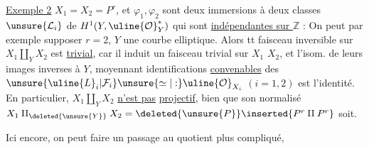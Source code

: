 \uline{Exemple 2}  $X_1=X_2=P^r$, et $\varphi_1,\varphi_2$ sont deux  immersions  à deux  classes $\unsure{\mathcal L_i}$ de $H^1(Y,\uline{\mathcal O}_Y^*)$  qui sont \uline{indépendantes sur $\mathbb Z$} : On peut par exemple supposer $r=2$, $Y$ une courbe elliptique. Alors  tt faisceau inversible sur $X_1\amalg_Y X_2$ est \uline{trivial}, car il induit un faisceau trivial sur $X_1$ \deleted{$\unsure{\times}$} $X_2$, et l'isom.  de leurs  images inverses à $Y$, moyennant identifications \uline{convenables} des $\unsure{\uline{L}_i|\mathcal F_i}\unsure{\simeq|:}\uline{\mathcal O}_{X_i}$ $(i=1,2)$ est l'identité. En particulier, $X_1\amalg_Y X_2$ \uline{n'est pas} \uline{projectif}, bien que son normalisé $X_1\amalg_{\deleted{\unsure{Y}}}X_2=\deleted{\unsure{P}}\inserted{P^r\amalg P^r}$ soit.

Ici encore,  on peut faire un passage au quotient plus compliqué,
